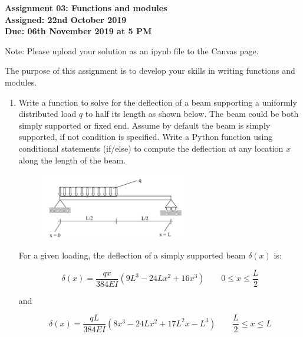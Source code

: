\documentclass[a4paper,12pt]{article}
\begin{document}
\begin{centering}
	\textbf{
		Assignment 03: Functions and modules\\
		Assigned: 22nd October 2019\\
		Due: 06th November 2019 at 5 PM\\
	}
\end{centering}


Note: Please upload your solution as an ipynb file to the Canvas page.

\vspace{1em}
 
 The purpose of this assignment is to develop your skills in writing functions and modules.
 
\begin{enumerate}
	
	\item Write a function to solve for the deflection of a beam supporting a uniformly distributed load $q$ to half its length as shown below. The beam could be both simply supported or fixed end. Assume by default the beam is simply supported, if not condition is specified. Write a Python function using conditional statements (if/else) to compute the deflection at any location $x$ along the length of the beam.

	\begin{figure}[ht]
		\centering
		\includegraphics[width=0.6\textwidth]{ss-beam.png}
	\end{figure}

	For a given loading, the deflection of a simply supported beam $\delta(x)$ is:
	
	\begin{equation*}
		\delta(x) = \frac{q x}{384EI}(9L^3 - 24Lx^2 + 16x^3) \qquad 0 \le x \le \frac{L}{2}
	\end{equation*}
	
	and 

	\begin{equation*}
	\delta(x) = \frac{q L}{384EI}(8x^3 - 24Lx^2 + 17L^2x -L^3) \qquad \frac{L}{2} \le x \le L
	\end{equation*}
	

\end{enumerate}
\end{document}
